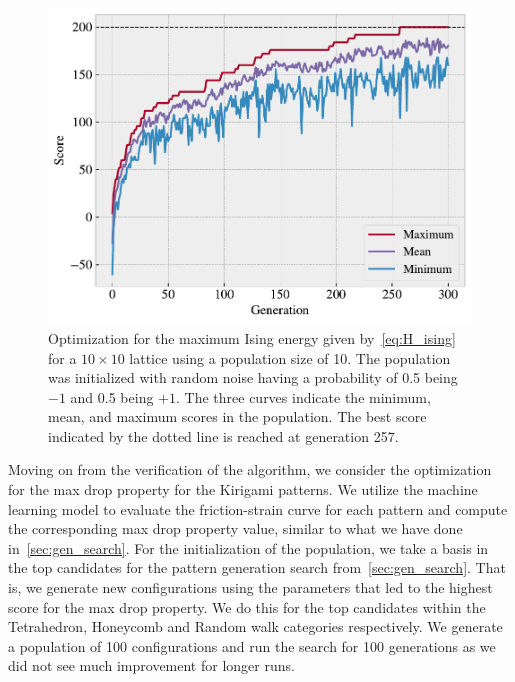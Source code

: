 \begin{figure}[!htb]
  \centering
  \includegraphics[width=0.6\linewidth]{figures/search/ising_max_history.pdf}
  \caption{Optimization for the maximum Ising energy given by~\cref{eq:H_ising} for a $10 \times 10$ lattice using a population size of 10. The population was initialized with random noise having a probability of 0.5 being $-1$ and 0.5 being $+1$. The three curves indicate the minimum, mean, and maximum scores in the population. The best score indicated by the dotted line is reached at generation 257. }
  \label{fig:ising_max_history}
\end{figure}  

Moving on from the verification of the algorithm, we consider the optimization
for the max drop property for the Kirigami patterns. We utilize the machine
learning model to evaluate the friction-strain curve for each pattern and
compute the corresponding max drop property value, similar to what we have
done in~\cref{sec:gen_search}. For the initialization of the population, we take
a basis in the top candidates for the pattern generation search
from~\cref{sec:gen_search}. That is, we generate new configurations using the
parameters that led to the highest score for the max drop property. We do this
for the top candidates within the Tetrahedron, Honeycomb and Random walk
categories respectively. We generate a population of 100 configurations and run
the search for 100 generations as we did not see much improvement for longer
runs. 

